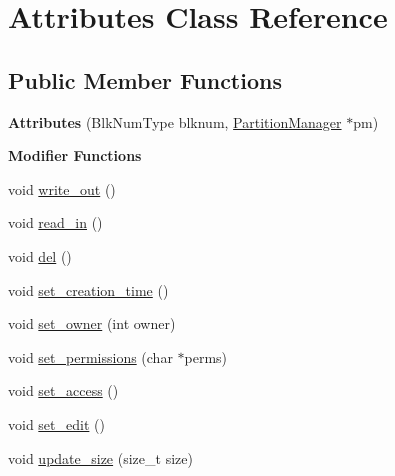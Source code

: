 \hypertarget{classAttributes}{}\section{Attributes Class Reference}
\label{classAttributes}
\subsection*{Public Member Functions}
\begin{DoxyCompactItemize}
\item 
{\bfseries Attributes} (Blk\+Num\+Type blknum, \hyperlink{classPartitionManager}{Partition\+Manager} $\ast$pm)\hypertarget{classAttributes_a0d6b154029e34f811f0930806768f022}{}\label{classAttributes_a0d6b154029e34f811f0930806768f022}

\end{DoxyCompactItemize}
\begin{Indent}{\bf Modifier Functions}\par
\begin{DoxyCompactItemize}
\item 
void \hyperlink{classAttributes_a7066f30d97317f75a02a137d09a2065e}{write\+\_\+out} ()
\item 
void \hyperlink{classAttributes_ac33fbd6871ef707878690be92b9fc7ec}{read\+\_\+in} ()
\item 
void \hyperlink{classAttributes_acf28e724c914f066ecdae788d95b3212}{del} ()
\item 
void \hyperlink{classAttributes_a4c518dae976d9186337f655f7b09cecc}{set\+\_\+creation\+\_\+time} ()
\item 
void \hyperlink{classAttributes_affdf3abb52a45ac3c9051bafd0da9e7e}{set\+\_\+owner} (int owner)
\item 
void \hyperlink{classAttributes_aac8ca00f98b22280df69f62e42b72b8b}{set\+\_\+permissions} (char $\ast$perms)
\item 
void \hyperlink{classAttributes_af2ce6f6dce652a7adfeba3f28b4ee0bc}{set\+\_\+access} ()
\item 
void \hyperlink{classAttributes_a88674bf65fba99d32870c7fa48edf135}{set\+\_\+edit} ()
\item 
void \hyperlink{classAttributes_a3983ec45af66e9b19367222092b7df6c}{update\+\_\+size} (size\+\_\+t size)
\end{DoxyCompactItemize}
\end{Indent}
